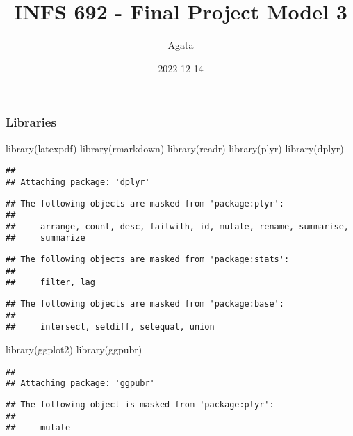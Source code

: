 \documentclass[
]{article}
\title{INFS 692 - Final Project Model 3}
\author{Agata}
\date{2022-12-14}
\newenvironment{Shaded}{\begin{snugshade}}{\end{snugshade}}
\newcommand{\FunctionTok}[1]{\textcolor[rgb]{0.00,0.00,0.00}{#1}}
\newcommand{\NormalTok}[1]{#1}
\begin{document}
\maketitle

\hypertarget{libraries}{%
\subsubsection{Libraries}\label{libraries}}

\begin{Shaded}
\begin{Highlighting}[]
\FunctionTok{library}\NormalTok{(latexpdf)}
\FunctionTok{library}\NormalTok{(rmarkdown)}
\FunctionTok{library}\NormalTok{(readr)}
\FunctionTok{library}\NormalTok{(plyr)}
\FunctionTok{library}\NormalTok{(dplyr)}
\end{Highlighting}
\end{Shaded}

\begin{verbatim}
## 
## Attaching package: 'dplyr'
\end{verbatim}

\begin{verbatim}
## The following objects are masked from 'package:plyr':
## 
##     arrange, count, desc, failwith, id, mutate, rename, summarise,
##     summarize
\end{verbatim}

\begin{verbatim}
## The following objects are masked from 'package:stats':
## 
##     filter, lag
\end{verbatim}

\begin{verbatim}
## The following objects are masked from 'package:base':
## 
##     intersect, setdiff, setequal, union
\end{verbatim}

\begin{Shaded}
\begin{Highlighting}[]
\FunctionTok{library}\NormalTok{(ggplot2)}
\FunctionTok{library}\NormalTok{(ggpubr)}
\end{Highlighting}
\end{Shaded}

\begin{verbatim}
## 
## Attaching package: 'ggpubr'
\end{verbatim}

\begin{verbatim}
## The following object is masked from 'package:plyr':
## 
##     mutate
\end{verbatim}
\end{document}
